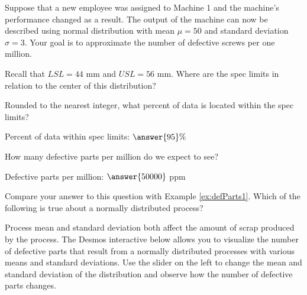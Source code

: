 \documentclass{ximera}
\begin{document}
\begin{question}\label{quest:defParts1}
    Suppose that a new employee was assigned to Machine 1 and the machine's performance changed as a result.   The output of the machine can now be described using normal distribution with mean $\mu=50$ and standard deviation $\sigma=3$.  Your goal is to approximate the number of defective screws per one million.

    Recall that $LSL=44$ mm and $USL=56$ mm. Where are the spec limits in relation to the center of this distribution?

    \begin{multipleChoice}
    \end{multipleChoice}

Rounded to the nearest integer, what percent of data is located within the spec limits?

Percent of data within spec limits: $\answer{95}\%$

How many defective parts per million do we expect to see?  

Defective parts per million: $\answer{50000}$ ppm

Compare your answer to this question with Example \ref{ex:defParts1}.  Which of the following is true about a normally distributed process?

\begin{multipleChoice}
    \end{multipleChoice}
    \end{question}

Process mean and standard deviation both affect the amount of scrap produced by the process.  The Desmos interactive below allows you to visualize the number of defective parts that result from a normally distributed processes with various means and standard deviations.  Use the slider on the left to change the mean and standard deviation of the distribution and observe how the number of defective parts changes.

\begin{onlineOnly}
\begin{center} 
\end{center}
\end{onlineOnly}
\end{document}

